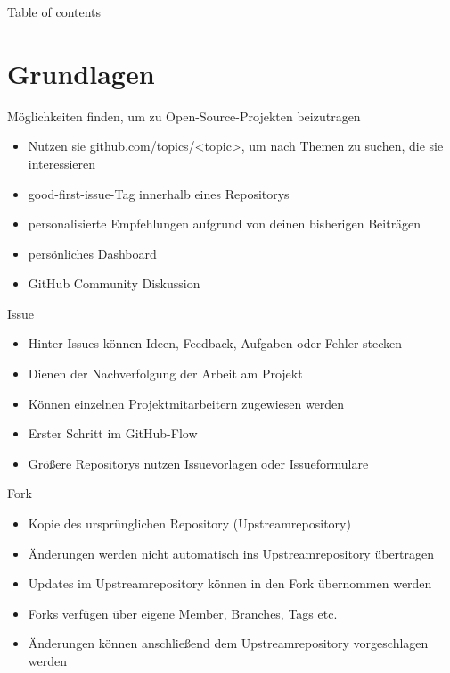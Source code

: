 \documentclass[compress,aspectratio=169]{beamer}
\begin{document}
	\begin{frame}[plain]
		\titlepage
	\end{frame}

	\begin{frame}[t]{Table of contents}
		\tableofcontents[subsectionstyle=hide/hide]
	\end{frame}


	\section{Grundlagen}

	\begin{frame}{Möglichkeiten finden, um zu Open-Source-Projekten beizutragen}
		\begin{itemize}
			\item Nutzen sie github.com/topics/<topic>, um nach Themen zu suchen, die sie interessieren
            \item good-first-issue-Tag innerhalb eines Repositorys
            \item personalisierte Empfehlungen aufgrund von deinen bisherigen Beiträgen
            \item persönliches Dashboard
            \item GitHub Community Diskussion
		\end{itemize}
	\end{frame}
    \begin{frame}{Issue}
		\begin{itemize}
			\item Hinter Issues können Ideen, Feedback, Aufgaben oder Fehler stecken
            \item Dienen der Nachverfolgung der Arbeit am Projekt
            \item Können einzelnen Projektmitarbeitern zugewiesen werden
            \item Erster Schritt im GitHub-Flow
            \item Größere Repositorys nutzen Issuevorlagen oder Issueformulare
		\end{itemize}
	\end{frame}
 \begin{frame}{Fork}
		\begin{itemize}
            	\item Kopie des ursprünglichen Repository (Upstreamrepository)
               \item Änderungen werden nicht automatisch ins Upstreamrepository übertragen
               \item Updates im Upstreamrepository können in den Fork übernommen werden
               \item Forks verfügen über eigene Member, Branches, Tags etc.
               \item Änderungen können anschließend dem Upstreamrepository vorgeschlagen werden
		\end{itemize}
\end{frame}
\end{document}
